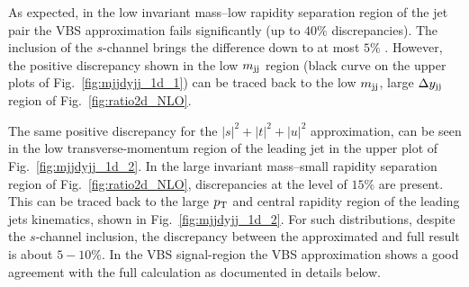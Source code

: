 As expected, in the low invariant mass--low rapidity separation region of the jet pair the VBS approximation fails significantly (up to $40\%$ discrepancies).
The inclusion of the $s$-channel brings the difference down to at most $5\%$ .
However, the positive discrepancy shown in the low $m_{\text{j}\text{j}}$ region (black curve on the upper plots of Fig.~\ref{fig:mjjdyjj_1d_1}) can be traced back to the low $m_{\text{j}\text{j}}$, large $\Delta y_{\text{j}\text{j}}$ region of Fig.~\ref{fig:ratio2d_NLO}.
% 

The same positive discrepancy for the $|s|^2 + |t|^2 + |u|^2$ approximation, can be seen in the low transverse-momentum region of the leading jet in the upper plot of Fig.~\ref{fig:mjjdyjj_1d_2}.
In the large invariant mass--small rapidity separation region of Fig.~\ref{fig:ratio2d_NLO}, discrepancies at the level of $15\%$ are present.
This can be traced back to the large $p_\text{T}$ and central rapidity region of the leading jets kinematics, shown in Fig.~\ref{fig:mjjdyjj_1d_2}.
For such distributions, despite the $s$-channel inclusion, the discrepancy between the approximated and full result is about $5-10\%$.
In the VBS signal-region the VBS approximation shows a good agreement with the full calculation as documented in details below.

